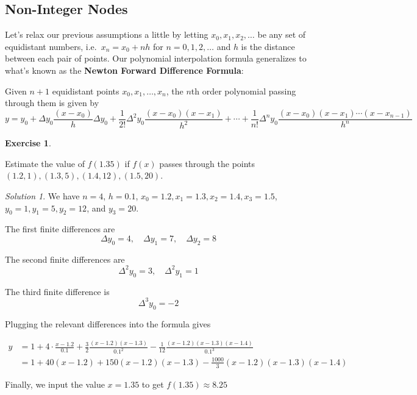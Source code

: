 \documentclass[
]{book}
\theoremstyle{definition}
\theoremstyle{definition}
\theoremstyle{definition}
\newtheorem{exercise}{Exercise}[chapter]
\theoremstyle{definition}
\theoremstyle{remark}
\newtheorem*{solution}{Solution}
\begin{document}
\hypertarget{non-integer-nodes}{%
\subsection{Non-Integer Nodes}\label{non-integer-nodes}}

Let's relax our previous assumptions a little by letting \(x_0, x_1, x_2,\ldots\) be any set of equidistant numbers, i.e.~\(x_n=x_0+nh\) for \(n=0,1,2,\ldots\) and \(h\) is the distance between each pair of points. Our polynomial interpolation formula generalizes to what's known as the \textbf{Newton Forward Difference Formula}:

Given \(n+1\) equidistant points \(x_0, x_1, \ldots, x_n\), the \(n\)th order polynomial passing through them is given by \[y= y_0 + \Delta y_0\frac{(x-x_0)}{h}\Delta y_0 + \frac{1}{2!}\Delta^2 y_0 \frac{(x-x_0)(x-x_1)}{h^2}+ \cdots + \frac{1}{n!}\Delta^n y_0 \frac{(x-x_0)(x-x_1)\cdots (x-x_{n-1})}{h^n}\]

\begin{exercise}
\protect\hypertarget{exr:unlabeled-div-146}{}\label{exr:unlabeled-div-146}

Estimate the value of \(f(1.35)\) if \(f(x)\) passes through the points \((1.2, 1),(1.3, 5),(1.4,12), (1.5, 20)\).

\end{exercise}

\begin{solution}

We have \(n=4\), \(h=0.1\), \(x_0=1.2, x_1=1.3, x_2=1.4, x_3=1.5\), \(y_0=1, y_1=5, y_2=12\), and \(y_3=20\).

The first finite differences are \[\Delta y_0 = 4, \quad \Delta y_1 =7, \quad \Delta y_2 = 8\]

The second finite differences are \[\Delta^2 y_0 = 3, \quad \Delta^2 y_1 =1\]

The third finite difference is \[\Delta^3 y_0 = -2\]

Plugging the relevant differences into the formula gives

\begin{align*}
y &=1+ 4\cdot\frac{x-1.2}{0.1}+ \frac{3}{2}\frac{(x-1.2)(x-1.3)}{0.1^2}-\frac{1}{12}\frac{(x-1.2)(x-1.3)(x-1.4)}{0.1^3}\\
&= 1+ 40(x-1.2)+150(x-1.2)(x-1.3)-\frac{1000}{3}(x-1.2)(x-1.3)(x-1.4)
\end{align*}

Finally, we input the value \(x=1.35\) to get \(f(1.35)\approx 8.25\)

\end{solution}
\end{document}
